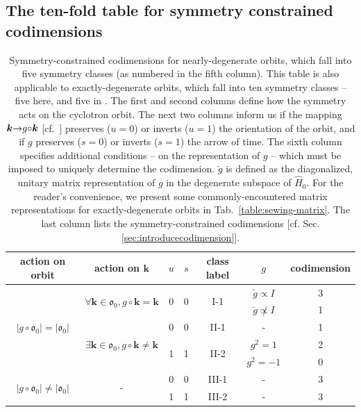 \documentclass[aps, showpacs, twocolumn, notitlepage, superscriptaddress]{revtex4-1}
\begin{document}
\subsection{The ten-fold table for symmetry constrained codimensions}\label{sec:tenfold}

\begin{table}
\begin{tabular}{|c|c|c|c|c|c|c|}
\hline 
action on orbit & action on $\boldsymbol{k}$  & $u$ & $s$  & class label & $g$  & codimension\tabularnewline
\hline 
\multirow{5}{*}{$|g\circ\mathfrak{o}_{0}|=|\mathfrak{o}_{0}|$} & \multirow{2}{*}{$\forall\boldsymbol{k}\in\mathfrak{o}_{0},g\circ\boldsymbol{k}=\boldsymbol{k}$} & \multirow{2}{*}{0} & \multirow{2}{*}{0} & \multirow{2}{*}{I-1} & $\breve{g}\propto I$  & 3\tabularnewline
\cline{6-7} 
 &  &  &  &  & $\breve{g}\not\propto I$  & 1\tabularnewline
\cline{2-7} 
 & \multirow{3}{*}{$\exists\boldsymbol{k}\in\mathfrak{o}_{0},g\circ\boldsymbol{k}\neq\boldsymbol{k}$} & 0 & 0 & II-1 & - & 1\tabularnewline
\cline{3-7} 
 &  & \multirow{2}{*}{1} & \multirow{2}{*}{1} & \multirow{2}{*}{II-2} & $g^{2}=1$  & 2\tabularnewline
\cline{6-7} 
 &  &  &  &  & $g^{2}=-1$  & 0\tabularnewline
\hline 
\multirow{2}{*}{$|g\circ\mathfrak{o}_{0}|\neq|\mathfrak{o}_{0}|$ } & \multirow{2}{*}{-} & 0 & 0 & III-1 & - & 3\tabularnewline
\cline{3-7} 
 &  & 1 & 1 & III-2 & - & 3\tabularnewline
\hline 
\end{tabular}
\caption{Symmetry-constrained codimensions for nearly-degenerate orbits, which fall into five symmetry classes (as numbered in the fifth column). This table is also applicable to exactly-degenerate orbits, which fall into ten symmetry classes -- five here, and five in  . The first and second columns define how the symmetry acts on the cyclotron orbit. The next two columns inform us if the mapping $\boldsymbol{k}{\rightarrow}g{\circ}\boldsymbol{k}$ [cf.\ ]  preserves ($u{=}0$) or inverts ($u{=}1$) the orientation of the orbit, and if $g$ preserves ($s{=}0$) or inverts ($s{=}1$) the arrow of time. The sixth column specifies additional conditions -- on the representation of $g$ -- which must be imposed to uniquely determine the codimension. $\breve{g}$ is defined as the diagonalized, unitary matrix representation of $g$ in the degenerate subspace of $\hat{H}_0$. For the reader's convenience, we present some commonly-encountered matrix representations for exactly-degenerate orbits in Tab.\ \ref{table:sewing-matrix}. The last column lists the symmetry-constrained codimensions [cf. Sec. \ref{sec:introducecodimension}]. \label{table:codimension-nearlydegen}}
\end{table}
\end{document}
